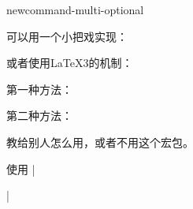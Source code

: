 

{newcommand-multi-optional}

可以用一个小把戏实现：
\begin{texlist}
  \newcommand{\mycmd}[1][option1]{%
    \def\ArgI{{#1}}%
    \mycmdoptii
  }
  \newcommand\mycmdoptii[1][option2]{%
    ...
  }
\end{texlist}

或者使用\LaTeX{3}的机制：
\begin{texlist}
  \usepackage{xparse}
  \NewDocumentCommand{}
\end{texlist}





第一种方法：
\begin{texlist}
  \newcommand{\mycmd}[2][\DefaultOpt]{%
    \def\DefaultOpt{#2}%
    optional arg: #1,  mandatory arg: #2%
  }
\end{texlist}

第二种方法：
\begin{texlist}
  \def\mycmd{\futurelet\testchar\WithOptCmd}
  \def\WithOptCmd{%
    \ifx[\testchar 
      \let\next\OptCmd 
    \else 
      \let\next\NoOptCmd 
    \fi\next}
  \def\OptCmd[#1]#2{optional arg: #1,  mandatory arg: #2}
  \def\NoOptCmd#1{optional arg: #1,  mandatory arg: #1}
\end{texlist}



教给别人怎么用，或者不用这个宏包。





使用 |\usepackage{indentfirst}|









